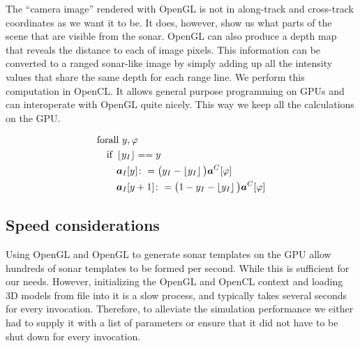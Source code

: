 The ``camera image'' rendered with OpenGL is not in along-track and cross-track coordinates as we want it to be. It does, however, show us what parts of the scene that are visible from the sonar. OpenGL can also produce a depth map that reveals the distance to each of image pixels. This information can be converted to a ranged sonar-like image by simply adding up all the intensity values that share the same depth for each range line. We perform this computation in OpenCL. It allows general purpose programming on GPUs and can interoperate with OpenGL quite nicely. This way we keep all the calculations on the GPU.

\begin{align}
&\text{forall } y,\varphi \nonumber\\
&\quad\text{if }\left\lfloor y_I\right\rfloor == y \nonumber\\
&\qquad\boldsymbol{a}_I[y] \colon= \big(y_I - \left\lfloor y_I\right\rfloor\big)\boldsymbol{a}^C[\varphi] \nonumber\\
&\qquad\boldsymbol{a}_I[y+1] \colon= \big(1 - y_I - \left\lfloor y_I\right\rfloor\big)\boldsymbol{a}^C[\varphi]
\end{align}


\subsection{Speed considerations}

Using OpenGL and OpenGL to generate sonar templates on the GPU allow hundreds of sonar templates to be formed per second. While this is sufficient for our needs. However, initializing the OpenGL and OpenCL context and loading 3D models from file into it is a slow process, and typically takes several seconds for every invocation. Therefore, to alleviate the simulation performance we either had to supply it with a list of parameters or ensure that it did not have to be shut down for every invocation. 


